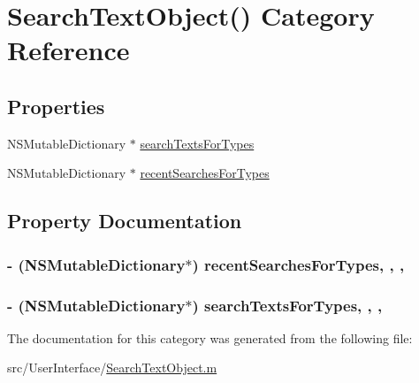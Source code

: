 \hypertarget{category_search_text_object_07_08}{\section{Search\-Text\-Object() Category Reference}
\label{category_search_text_object_07_08}
}
\subsection*{Properties}
\begin{DoxyCompactItemize}
\item 
N\-S\-Mutable\-Dictionary $\ast$ \hyperlink{category_search_text_object_07_08_abea89e3a5b49f70a84ce07c6afb792c0}{search\-Texts\-For\-Types}
\item 
N\-S\-Mutable\-Dictionary $\ast$ \hyperlink{category_search_text_object_07_08_a65254cbf048116b9c6e83c8837f00aa5}{recent\-Searches\-For\-Types}
\end{DoxyCompactItemize}


\subsection{Property Documentation}
\hypertarget{category_search_text_object_07_08_a65254cbf048116b9c6e83c8837f00aa5}{
\subsubsection[{recent\-Searches\-For\-Types}]{\setlength{\rightskip}{0pt plus 5cm}-\/ (N\-S\-Mutable\-Dictionary$\ast$) recent\-Searches\-For\-Types\hspace{0.3cm}{\ttfamily [read]}, {\ttfamily [write]}, {\ttfamily [atomic]}, {\ttfamily [retain]}}}\label{category_search_text_object_07_08_a65254cbf048116b9c6e83c8837f00aa5}
\hypertarget{category_search_text_object_07_08_abea89e3a5b49f70a84ce07c6afb792c0}{
\subsubsection[{search\-Texts\-For\-Types}]{\setlength{\rightskip}{0pt plus 5cm}-\/ (N\-S\-Mutable\-Dictionary$\ast$) search\-Texts\-For\-Types\hspace{0.3cm}{\ttfamily [read]}, {\ttfamily [write]}, {\ttfamily [atomic]}, {\ttfamily [retain]}}}\label{category_search_text_object_07_08_abea89e3a5b49f70a84ce07c6afb792c0}


The documentation for this category was generated from the following file\-:\begin{DoxyCompactItemize}
\item 
src/\-User\-Interface/\hyperlink{_search_text_object_8m}{Search\-Text\-Object.\-m}\end{DoxyCompactItemize}
